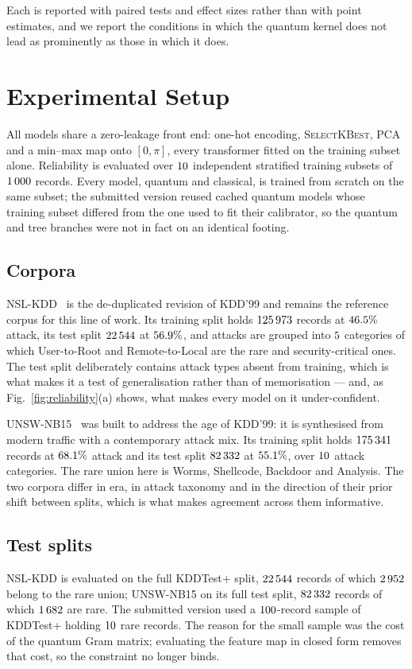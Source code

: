 \documentclass[journal]{IEEEtran}
\begin{document}
Each is reported with paired tests and effect sizes rather than with point
estimates, and we report the conditions in which the quantum kernel does not
lead as prominently as those in which it does.

\section{Experimental Setup}\label{sec:setup}

All models share a zero-leakage front end: one-hot encoding,
\textsc{SelectKBest}, PCA and a min--max map onto $[0,\pi]$, every
transformer fitted on the training subset alone. Reliability is evaluated
over $10$ independent stratified training subsets of $1\,000$
records. Every model, quantum and classical, is trained from scratch on the
same subset; the submitted version reused cached quantum models whose
training subset differed from the one used to fit their calibrator, so the
quantum and tree branches were not in fact on an identical footing.

\subsection{Corpora}
NSL-KDD~\cite{tavallaee2009nslkdd} is the de-duplicated revision of KDD'99
and remains the reference corpus for this line of work. Its training split
holds $125\,973$ records at $46.5\%$ attack, its test
split $22\,544$ at $56.9\%$, and attacks are grouped
into $5$ categories of which User-to-Root and Remote-to-Local
are the rare and security-critical ones. The test split deliberately
contains attack types absent from training, which is what makes it a test of
generalisation rather than of memorisation --- and, as
Fig.~\ref{fig:reliability}(a) shows, what makes every model on it
under-confident.

UNSW-NB15~\cite{moustafa2015unsw} was built to address the age of KDD'99: it
is synthesised from modern traffic with a contemporary attack mix. Its
training split holds $175\,341$ records at
$68.1\%$ attack and its test split $82\,332$ at
$55.1\%$, over $10$ attack categories. The rare
union here is Worms, Shellcode, Backdoor and Analysis. The two corpora
differ in era, in attack taxonomy and in the direction of their prior shift
between splits, which is what makes agreement across them informative.

\subsection{Test splits}
NSL-KDD is evaluated on the full KDDTest+ split, $22\,544$ records of which
$2\,952$ belong to the rare union; UNSW-NB15 on its full test split,
$82\,332$ records of which $1\,682$ are rare. The submitted version
used a $100$-record sample of KDDTest+ holding $10$ rare
records. The reason for the small sample was the cost of the quantum Gram
matrix; evaluating the feature map in closed form removes that cost, so the
constraint no longer binds.
\end{document}
